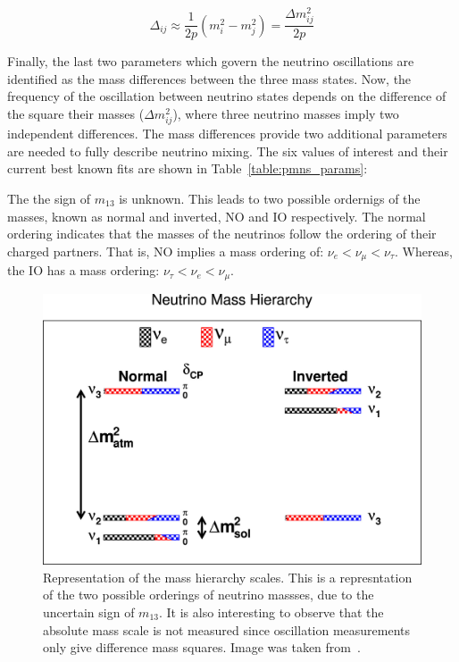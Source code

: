 \begin{equation}
\Delta_{ij} \approx \frac{1}{2p}(m^2_{i}-m^{2}_{j}) = \frac{\Delta m_{ij}^2}{2p}
\end{equation}

Finally, the last two parameters which govern the neutrino oscillations are identified as the mass differences between the three mass states.
Now, the frequency of the oscillation between neutrino states depends on the difference of the square their masses ($\Delta m_{ij}^{2}$), where three neutrino masses imply two independent differences.
The mass differences provide two additional parameters are needed to fully describe neutrino mixing.
The six values of interest and their current best known fits are shown in Table~\ref{table:pmns_params}:

The the sign of $m_{13}$ is unknown.
This leads to two possible ordernigs of the masses, known as normal and inverted, NO and IO respectively.
The normal ordering indicates that the masses of the neutrinos follow the ordering of their charged partners.
That is, NO implies a mass ordering of: $\nu_{e} < \nu_{\mu} < \nu_{\tau}$.
Whereas, the IO has a mass ordering: $\nu_{\tau} < \nu_{e} < \nu_{\mu}$.

\begin{figure}[]
\centering
\includegraphics[width=\textwidth]{images/mass_hierarchy.jpg}
\caption{Representation of the mass hierarchy scales. This is a represntation of the two possible orderings of neutrino massses, due to the uncertain sign of $m_{13}$. It is also interesting to observe that the absolute mass scale is not measured since oscillation measurements only give difference mass squares. Image was taken from~\citep{QIAN20151}.}
\end{figure}~\label{fig:mass_hierarchy}

